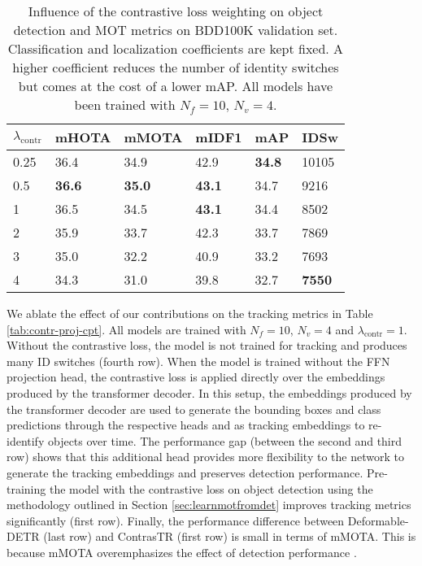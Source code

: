 \vspace{-0.5em}
\begin{table}[h!]
\centering \footnotesize
\begin{tabular}{llllll}
\toprule
$\lambda_{\mathrm{contr}}$ & mHOTA & mMOTA & mIDF1 & mAP & IDSw \\ \midrule
0.25 & 36.4         & 34.9          & 42.9          & \textbf{34.8}      & 10105      \\
0.5 & \textbf{36.6}      & \textbf{35.0}      & \textbf{43.1}     & 34.7     & 9216 \\
1   & 36.5      & 34.5      & \textbf{43.1}     & 34.4     & 8502 \\
2   & 35.9      & 33.7      & 42.3     & 33.7     & 7869    \\
3   & 35.0      & 32.2      & 40.9     & 33.2     & 7693 \\
4   & 34.3      & 31.0      & 39.8     & 32.7     & \textbf{7550} \\
\bottomrule
\end{tabular}
\caption{Influence of the contrastive loss weighting on object detection and MOT metrics on BDD100K validation set. Classification and localization coefficients are kept fixed. A higher coefficient reduces the number of identity switches but comes at the cost of a lower mAP. All models have been trained with $N_f=10$, $N_v=4$.} 
\label{tab:contr-loss-weight-variation}
\vspace{-1em}
\end{table}

We ablate the effect of our contributions on the tracking metrics in Table \ref{tab:contr-proj-cpt}. All models are trained with $N_f=10$, $N_v=4$ and $\lambda_{\mathrm{contr}}=1$.
Without the contrastive loss, the model is not trained for tracking and produces many ID switches (fourth row).
When the model is trained without the FFN projection head, the contrastive loss is applied directly over the embeddings produced by the transformer decoder. In this setup, the embeddings produced by the transformer decoder are used to generate the bounding boxes and class predictions through the respective heads and as tracking embeddings to re-identify objects over time. The performance gap (between the second and third row) shows that this additional head provides more flexibility to the network to generate the tracking embeddings and preserves detection performance.
Pre-training the model with the contrastive loss on object detection using the methodology outlined in Section \ref{sec:learnmotfromdet} improves tracking metrics significantly (first row).
Finally, the performance difference between Deformable-DETR (last row) and ContrasTR (first row) is small in terms of mMOTA. This is because mMOTA overemphasizes the effect of detection performance \cite{Luiten2020IJCV}.

